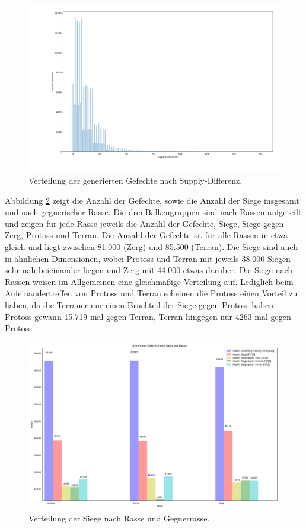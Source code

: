 \begin{figure}[ht]
\centering
\includegraphics[scale=0.3]{pictures/Match_verteilung}
\caption{Verteilung der generierten Gefechte nach Supply-Differenz.}
\label{fig:suppvert}
\end{figure}

Abbildung \ref{fig:siegvert} zeigt die Anzahl der Gefechte, sowie die Anzahl der Siege insgesamt und nach gegnerischer Rasse. Die drei Balkengruppen sind nach Rassen aufgeteilt und zeigen für jede Rasse jeweils die Anzahl der Gefechte, Siege, Siege gegen Zerg, Protoss und Terran. Die Anzahl der Gefechte ist für alle Rassen in etwa gleich und liegt zwischen 81.000 (Zerg) und 85.500 (Terran). Die Siege sind auch in ähnlichen Dimensionen, wobei Protoss und Terran mit jeweils 38.000 Siegen sehr nah beieinander liegen und Zerg mit 44.000 etwas darüber. Die Siege nach Rassen weisen im Allgemeinen eine gleichmäßige Verteilung auf. Lediglich beim Aufeinandertreffen von Protoss und Terran scheinen die Protoss einen Vorteil zu haben, da die Terraner nur einen Bruchteil der Siege gegen Protoss haben. Protoss gewann 15.719 mal gegen Terran, Terran hingegen nur 4263 mal gegen Protoss.

\begin{figure}[ht]
\centering
\includegraphics[scale=0.3]{pictures/Graph_Matches_2}
\caption{Verteilung der Siege nach Rasse und Gegnerrasse.}
\label{fig:siegvert}
\end{figure}

